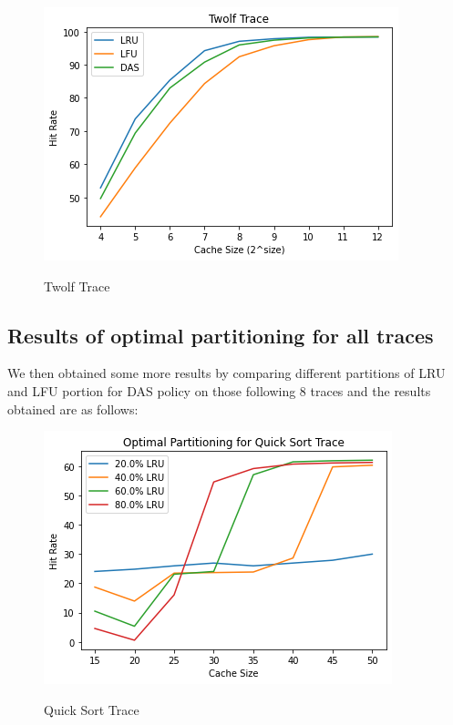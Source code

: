 \documentclass[conference]{IEEEtran}
\begin{document}
 \begin{figure}
        \centering
       \includegraphics[scale=0.6]{twolf.png}~
       \caption{Twolf Trace}\label{Fig:1}
 \end{figure}

\newpage

\subsection{\textbf{Results of optimal partitioning for all traces}}

We then obtained some more results by comparing different partitions of LRU and LFU portion for DAS policy on those following 8 traces and the results obtained are as follows:

\begin{figure}
        \centering
       \includegraphics[scale=0.6]{Qsort_partition.png}~
       \caption{Quick Sort Trace}\label{Fig:1}
 \end{figure}
\end{document}
